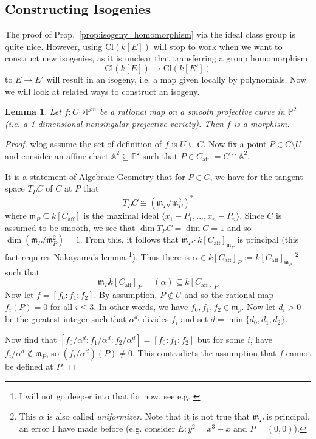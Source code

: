 \documentclass{scrartcl}
\newcommand{\Aff}{\mathbb{A}}
\newcommand{\Proj}{\mathbb{P}}
\newtheorem{lemma}[prop]{Lemma}
\theoremstyle{definition}
\begin{document}
\subsection{Constructing Isogenies}
The proof of Prop.~\ref{prop:isogeny_homomorphism} via the ideal class group is quite nice.
However, using $\mathrm{Cl}(k[E])$ will stop to work when we want to construct new isogenies, as it is unclear that transferring a group homomorphism
\begin{equation*}
    \mathrm{Cl}(k[E]) \to \mathrm{Cl}(k[E'])
\end{equation*}
to $E \to E'$ will result in an isogeny, i.e. a map given locally by polynomials.
Now we will look at related ways to construct an isogeny.
\begin{lemma}
    Let $f: C \dashrightarrow \Proj^m$ be a rational map on a smooth projective curve in $\Proj^2$ (i.e. a 1-dimensional nonsingular projective variety).
    Then $f$ is a morphism.
\end{lemma}
\begin{proof}
    wlog assume the set of definition of $f$ is $U \subseteq C$.
    Now fix a point $P \in C \setminus U$ and consider an affine chart $\Aff^2 \subseteq \Proj^2$ such that $P \in C_{\mathrm{aff}} := C \cap \Aff^2$.

    It is a statement of Algebraic Geometry that for $P \in C$, we have for the tangent space $T_P C$ of $C$ at $P$ that
    \begin{equation*}
        T_P C \cong (\mathfrak{m}_P/\mathfrak{m}_P^2)^*
    \end{equation*}
    where $\mathfrak{m}_P \subseteq k[C_{\mathrm{aff}}]$ is the maximal ideal $\langle x_1 - P_1, ..., x_n - P_n \rangle$.
    Since $C$ is assumed to be smooth, we see that $\dim T_P C = \dim C = 1$ and so $\dim (\mathfrak{m}_P/\mathfrak{m}_P^2) = 1$.
    From this, it follows that $\mathfrak{m}_P \cdot k[C_{\mathrm{aff}}]_{\mathfrak{m}_P}$ is principal (this fact requires Nakayama's lemma
    \footnote{I will not go deeper into that for now, see e.g. \cite[Chapter I §11 Exercise 7]{AlgNumberTheory}}).
    Thus there is $\alpha \in k[C_{\mathrm{aff}}]_P := k[C_{\mathrm{aff}}]_{\mathfrak{m}_P}$
    \footnote{This $\alpha$ is also called \emph{uniformizer}. Note that it is not true that $\mathfrak{m}_P$ is principal, an error I have made before (e.g. consider $E: y^2 = x^3 - x$ and $P = (0, 0)$).}
    such that
    \begin{equation*}
        \mathfrak{m}_P k[C_{\mathrm{aff}}]_P = (\alpha) \subseteq k[C_{\mathrm{aff}}]_P
    \end{equation*}
    Now let $f = [f_0 : f_1 : f_2]$.
    By assumption, $P \notin U$ and so the rational map $f_i(P) = 0$ for all $i \leq 3$.
    In other words, we have $f_0, f_1, f_2 \in \mathfrak{m}_p$.
    Now let $d_i > 0$ be the greatest integer such that $\alpha^{d_i}$ divides $f_i$ and set $d = \min\{d_0, d_1, d_2\}$.

    Now find that $[f_0/\alpha^d : f_1/\alpha^d : f_2/\alpha^d] = [f_0 : f_1 : f_2]$ but for some $i$, have $f_i/\alpha^d \notin \mathfrak{m}_P$, so $(f_i/\alpha^d)(P) \neq 0$.
    This contradicts the assumption that $f$ cannot be defined at $P$.
\end{proof}
\end{document}
